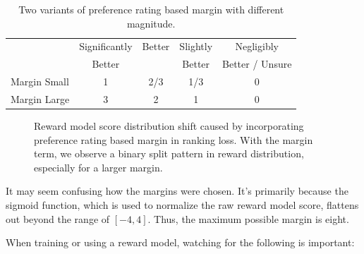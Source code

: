 \documentclass[
  letterpaper,
  numbers=noenddot,
  DIV=11]{scrreprt}
\theoremstyle{definition}
\theoremstyle{plain}
\theoremstyle{plain}
\theoremstyle{remark}
\begin{document}
\begin{longtable}[]{@{}lcccc@{}}
\caption{Two variants of preference rating based margin with different
magnitude.}\label{tbl-margin_nums}\tabularnewline
\toprule\noalign{}
\endfirsthead
\endhead
\bottomrule\noalign{}
\endlastfoot
& Significantly & Better & Slightly & Negligibly \\
& Better & & Better & Better / Unsure \\
Margin Small & 1 & 2/3 & 1/3 & 0 \\
Margin Large & 3 & 2 & 1 & 0 \\
\end{longtable}

\begin{figure}


\caption{\label{fig-margin-2}Reward model score distribution shift
caused by incorporating preference rating based margin in ranking loss.
With the margin term, we observe a binary split pattern in reward
distribution, especially for a larger margin.}

\end{figure}%

It may seem confusing how the margins were chosen. It's primarily
because the sigmoid function, which is used to normalize the raw reward
model score, flattens out beyond the range of \([-4, 4]\). Thus, the
maximum possible margin is eight.

When training or using a reward model, watching for the following is
important:
\end{document}
